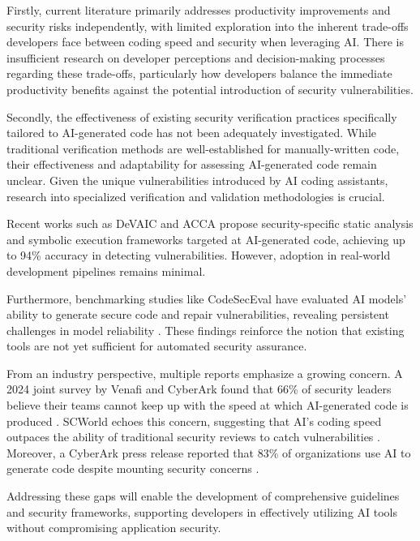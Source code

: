 Firstly, current literature primarily addresses productivity improvements and security risks independently, with limited exploration into the inherent trade-offs developers face between coding speed and security when leveraging AI. There is insufficient research on developer perceptions and decision-making processes regarding these trade-offs, particularly how developers balance the immediate productivity benefits against the potential introduction of security vulnerabilities.

Secondly, the effectiveness of existing security verification practices specifically tailored to AI-generated code has not been adequately investigated. While traditional verification methods are well-established for manually-written code, their effectiveness and adaptability for assessing AI-generated code remain unclear. Given the unique vulnerabilities introduced by AI coding assistants, research into specialized verification and validation methodologies is crucial.

Recent works such as DeVAIC \cite{deluca2024devaic} and ACCA \cite{cotroneo2024acca} propose security-specific static analysis and symbolic execution frameworks targeted at AI-generated code, achieving up to 94\% accuracy in detecting vulnerabilities. However, adoption in real-world development pipelines remains minimal.

Furthermore, benchmarking studies like CodeSecEval have evaluated AI models' ability to generate secure code and repair vulnerabilities, revealing persistent challenges in model reliability \cite{wang2024codesec}. These findings reinforce the notion that existing tools are not yet sufficient for automated security assurance.

From an industry perspective, multiple reports emphasize a growing concern. A 2024 joint survey by Venafi and CyberArk found that 66\% of security leaders believe their teams cannot keep up with the speed at which AI-generated code is produced \cite{venafi2024orgs}. SCWorld echoes this concern, suggesting that AI’s coding speed outpaces the ability of traditional security reviews to catch vulnerabilities \cite{scworld2024ai}. Moreover, a CyberArk press release reported that 83\% of organizations use AI to generate code despite mounting security concerns \cite{cyberark2024press}.

Addressing these gaps will enable the development of comprehensive guidelines and security frameworks, supporting developers in effectively utilizing AI tools without compromising application security.
